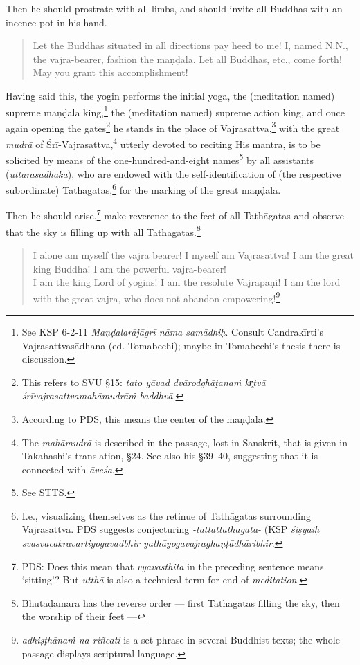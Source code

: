 \documentclass[11pt]{book}
\newcommand{\skt}[1]{\emph{#1}}
\begin{document}
Then he should prostrate with all limbs, and should invite all Buddhas with an incence pot in his hand.
	
\begin{verse}
	Let the Buddhas situated in all directions pay heed to me! I, named N.N., the vajra-bearer, fashion the maṇḍala. Let all Buddhas, etc., come forth! May you grant this accomplishment!
\end{verse}

\noindent Having said this, the yogin performs the initial yoga, the (meditation named) supreme maṇḍala king,\footnote{See KSP 6-2-11 \textit{Maṇḍalarājāgrī nāma samādhiḥ}. Consult Candrakīrti's Vajrasattvasādhana (ed. Tomabechi); maybe in Tomabechi's thesis there is discussion.} the (meditation named) supreme action king, and once again opening the gates\footnote{This refers to SVU §15: \skt{tato yāvad dvārodghāṭanaṁ kr̥tvā śrīvajrasattvamahāmudrāṁ baddhvā}.} he stands in the place of Vajrasattva,\footnote{According to PDS, this means the center of the maṇḍala.} with the great \skt{mudrā} of Śrī-Vajrasattva,\footnote{The \skt{mahāmudrā} is described in the passage, lost in Sanskrit, that is given in Takahashi's translation, §24. See also his §39–40, suggesting that it is connected with \skt{āveśa}.} utterly devoted to reciting His mantra, is to be solicited by means of the one-hundred-and-eight names\footnote{See STTS.} by all assistants (\skt{uttarasādhaka}), who are endowed with the self-identification of (the respective subordinate) Tathāgatas,\footnote{I.e., visualizing themselves as the retinue of Tathāgatas surrounding Vajrasattva. PDS suggests conjecturing \skt{-tattattathāgata-} (KSP \skt{śiṣyaiḥ svasvacakravartiyogavadbhir yathāyogavajraghaṇṭādhāribhir}.} for the marking of the great maṇḍala.

Then he should arise,\footnote{PDS: Does this mean that \skt{vyavasthita} in the preceding sentence means `sitting'? But \skt{utthā} is also a technical term for end of \skt{meditation}.} make reverence to the feet of all Tathāgatas and observe that the sky is filling up with all Tathāgatas.\footnote{Bhūtaḍāmara has the reverse order — first Tathagatas filling the sky, then the worship of their feet —}

\begin{verse}
	I alone am myself the vajra bearer! I myself am Vajrasattva! I am the great king Buddha! I am the powerful vajra-bearer!\\
	I am the king Lord of yogins! I am the resolute Vajrapāṇi! I am the lord with the great vajra, who does not abandon empowering!\footnote{\skt{adhiṣṭhānaṁ na riñcati} is a set phrase in several Buddhist texts; the whole passage displays scriptural language.}
\end{verse}
\end{document}
